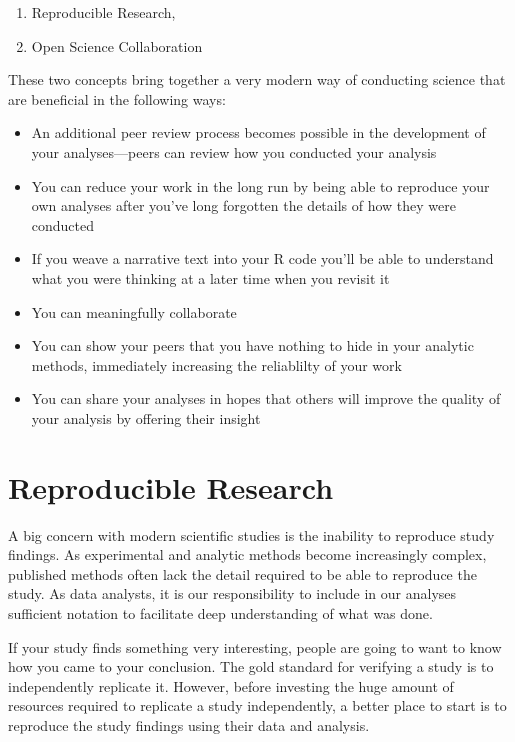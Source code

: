 \documentclass[]{book}
\providecommand{\tightlist}{%
  \setlength{\itemsep}{0pt}\setlength{\parskip}{0pt}}
\begin{document}
\begin{enumerate}
\def\labelenumi{\arabic{enumi})}
\tightlist
\item
  Reproducible Research,
\item
  Open Science Collaboration
\end{enumerate}

These two concepts bring together a very modern way of conducting
science that are beneficial in the following ways:

\begin{itemize}
\tightlist
\item
  An additional peer review process becomes possible in the development
  of your analyses---peers can review how you conducted your analysis
\item
  You can reduce your work in the long run by being able to reproduce
  your own analyses after you've long forgotten the details of how they
  were conducted
\item
  If you weave a narrative text into your R code you'll be able to
  understand what you were thinking at a later time when you revisit it
\item
  You can meaningfully collaborate
\item
  You can show your peers that you have nothing to hide in your analytic
  methods, immediately increasing the reliablilty of your work
\item
  You can share your analyses in hopes that others will improve the
  quality of your analysis by offering their insight
\end{itemize}

\section{Reproducible Research}\label{reproducible-research}

A big concern with modern scientific studies is the inability to
reproduce study findings. As experimental and analytic methods become
increasingly complex, published methods often lack the detail required
to be able to reproduce the study. As data analysts, it is our
responsibility to include in our analyses sufficient notation to
facilitate deep understanding of what was done.

If your study finds something very interesting, people are going to want
to know how you came to your conclusion. The gold standard for verifying
a study is to independently replicate it. However, before investing the
huge amount of resources required to replicate a study independently, a
better place to start is to reproduce the study findings using their
data and analysis.
\end{document}
